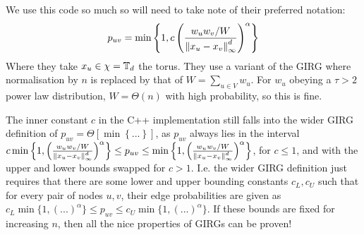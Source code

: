 We use this code so much so will need to take note of their preferred notation:
\begin{equation}
    p_{uv} = \min \left \{ 
        1,
        c \left (
            \frac{w_u w_v / W}{\left\lVert x_u - x_v\right\rVert_\infty^d}
        \right )^\alpha    
    \right \}
\end{equation}
Where they take $x_u \in \chi = \mathbb{T}_d$ the torus. They use a variant of the GIRG where normalisation by $n$ is replaced by that of $W = \sum_{u \in V} w_u$. For $w_u$ obeying a $\tau > 2$ power law distribution, $W = \Theta(n)$ with high probability, so this is fine.

The inner constant $c$ in the C++ implementation still falls into the wider GIRG definition of $p_{uv} = \Theta \left [ 
    \min \left \{ 
        ...
    \right \}
\right ]$, as $p_{uv}$ always lies in the interval $c \min \left \{ 
        1,
        \left (
            \frac{w_u w_v / W}{\left\lVert x_u - x_v\right\rVert_\infty^d}
        \right )^\alpha    
    \right \} \leq p_{uv} \leq \min \left \{ 
        1,
        \left (
            \frac{w_u w_v / W}{\left\lVert x_u - x_v\right\rVert_\infty^d}
        \right )^\alpha    
    \right \}$, for $c \leq 1$, and with the upper and lower bounds swapped for $c > 1$.
I.e. the wider GIRG definition just requires that there are some lower and upper bounding constants $c_L, c_U$ such that for every pair of nodes $u, v$, their edge probabilities are given as $c_L \min \{ 1, (...)^\alpha \} \leq p_{uv} \leq c_U \min \{ 1, (...)^\alpha \}$. If these bounds are fixed for increasing $n$, then all the nice properties of GIRGs can be proven!









